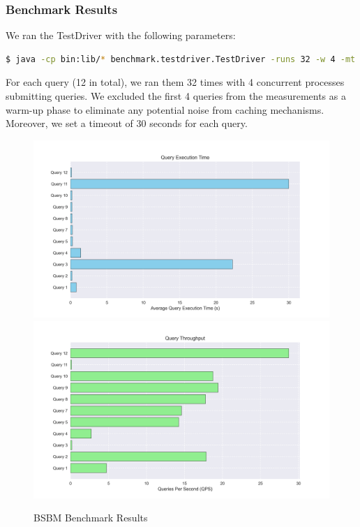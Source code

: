\subsubsection{Benchmark Results}
We ran the TestDriver with the following parameters:
\begin{lstlisting}[language=bash, caption={BSBM TestDriver class execution}, label={lst:testdriver}]
    $ java -cp bin:lib/* benchmark.testdriver.TestDriver -runs 32 -w 4 -mt 4 -t 30000 http://localhost:7200/repositories/BSBM
\end{lstlisting}
For each query (12 in total), we ran them 32 times with 4 concurrent processes submitting queries. We excluded the first 4 queries from the measurements as a warm-up phase to eliminate any potential noise from caching mechanisms. Moreover, we set a timeout of 30 seconds for each query.
\begin{figure}[ht]
    \includegraphics[width=15cm]{res/query_execution_time.png}
    \includegraphics[width=15cm]{res/query_throughput.png}
    \caption{BSBM Benchmark Results}
    \label{fig:bsbmbenchmarkresults}
\end{figure}

